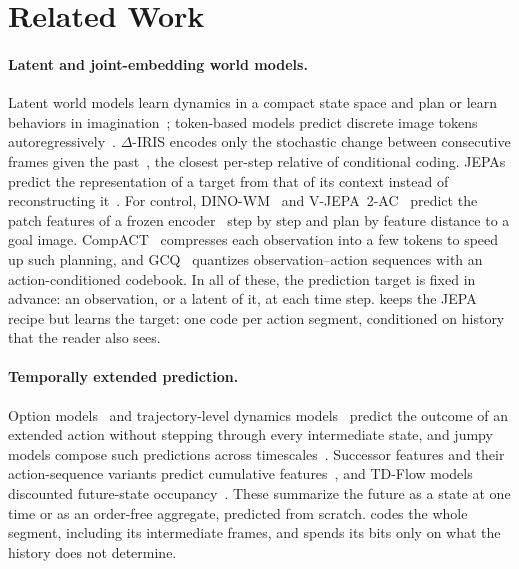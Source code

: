 \section{Related Work}
\label{sec:related}

\paragraph{Latent and joint-embedding world models.}
Latent world models learn dynamics in a compact state space and plan or learn behaviors in imagination~\cite{hafner2019planet,hafner2023dreamerv3,hansen2024tdmpc2}; token-based models predict discrete image tokens autoregressively~\cite{micheli2023iris}.
$\Delta$-IRIS encodes only the stochastic change between consecutive frames given the past~\cite{micheli2024deltairis}, the closest per-step relative of conditional coding.
JEPAs predict the representation of a target from that of its context instead of reconstructing it~\cite{lecun2022path,assran2023ijepa,bardes2024vjepa}.
For control, DINO-WM~\cite{zhou2025dinowm} and V-JEPA~2-AC~\cite{assran2025vjepa2} predict the patch features of a frozen encoder~\cite{oquab2024dinov2} step by step and plan by feature distance to a goal image.
CompACT~\cite{kim2026compact} compresses each observation into a few tokens to speed up such planning, and GCQ~\cite{peng2025gcq} quantizes observation--action sequences with an action-conditioned codebook.
In all of these, the prediction target is fixed in advance: an observation, or a latent of it, at each time step.
\method keeps the JEPA recipe but learns the target: one code per action segment, conditioned on history that the reader also sees.

\paragraph{Temporally extended prediction.}
Option models~\cite{sutton1999options} and trajectory-level dynamics models~\cite{lambert2021longterm,ding2024dwm} predict the outcome of an extended action without stepping through every intermediate state, and jumpy models compose such predictions across timescales~\cite{farebrother2026jumpy}.
Successor features and their action-sequence variants predict cumulative features~\cite{barreto2017sf,chen2023ramp}, and TD-Flow models discounted future-state occupancy~\cite{farebrother2025tdflow}.
These summarize the future as a state at one time or as an order-free aggregate, predicted from scratch.
\method codes the whole segment, including its intermediate frames, and spends its bits only on what the history does not determine.

